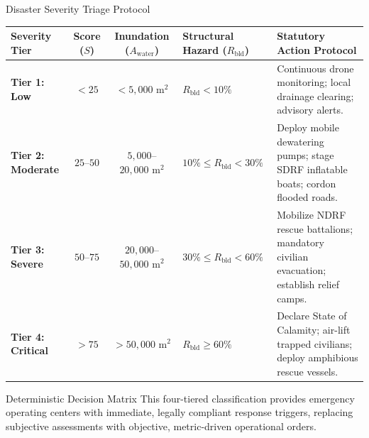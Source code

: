 \documentclass[aspectratio=169, 10pt, professionalfonts]{beamer}
\begin{document}
\begin{frame}{Disaster Severity Triage Protocol}
  \begin{table}[h]
    \scriptsize
    \centering
    \begin{tabularx}{\textwidth}{l C C Y Y}
      \toprule
      \textbf{Severity Tier} & \textbf{Score ($S$)} & \textbf{Inundation ($A_{\text{water}}$)} & \textbf{Structural Hazard ($R_{\text{bld}}$)} & \textbf{Statutory Action Protocol} \\
      \midrule
      \textbf{Tier 1: Low} & $<25$ & $<5,000\text{ m}^2$ & $R_{\text{bld}} < 10\%$ & Continuous drone monitoring; local drainage clearing; advisory alerts. \\
      \textbf{Tier 2: Moderate} & $25$--$50$ & $5,000$--$20,000\text{ m}^2$ & $10\% \le R_{\text{bld}} < 30\%$ & Deploy mobile dewatering pumps; stage SDRF inflatable boats; cordon flooded roads. \\
      \textbf{Tier 3: Severe} & $50$--$75$ & $20,000$--$50,000\text{ m}^2$ & $30\% \le R_{\text{bld}} < 60\%$ & Mobilize NDRF rescue battalions; mandatory civilian evacuation; establish relief camps. \\
      \textbf{Tier 4: Critical} & $>75$ & $>50,000\text{ m}^2$ & $R_{\text{bld}} \ge 60\%$ & Declare State of Calamity; air-lift trapped civilians; deploy amphibious rescue vessels. \\
      \bottomrule
    \end{tabularx}
  \end{table}

  \begin{block}{Deterministic Decision Matrix}
    \footnotesize
    This four-tiered classification provides emergency operating centers with immediate, legally compliant response triggers, replacing subjective assessments with objective, metric-driven operational orders.
  \end{block}
\end{frame}
\end{document}
